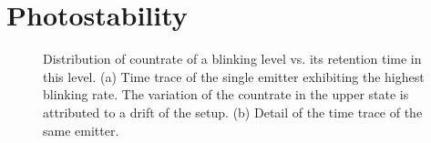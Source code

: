 



	\section{Photostability} \label{subsec::photostab}


	\begin{figure}[tp]
		\begin{subfigure}[tp]{ 0.49\linewidth}
			\caption{}\label{subfig::blink_long}
			\centering
		\end{subfigure}
		\hfill
		\begin{subfigure}[tp]{ 0.49\linewidth}
			\caption{}\label{subfig::blink_short}
			\centering
		\end{subfigure}
		\caption{Distribution of countrate of a blinking level vs. its retention time in this level. (a) Time trace of the single emitter exhibiting the highest blinking rate. The variation of the countrate in the upper state is attributed to a drift of the setup. (b) Detail of the time trace of the same emitter.}
		\label{fig::blink}
	\end{figure}

